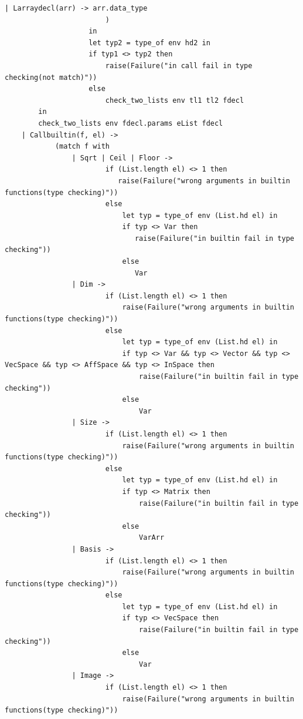 \documentclass[12pt]{article} %
\begin{document}
\begin{lstlisting}[style=appendix, caption=check.ml]
                            | Larraydecl(arr) -> arr.data_type
                        )
                    in 
                    let typ2 = type_of env hd2 in
                    if typ1 <> typ2 then
                        raise(Failure("in call fail in type checking(not match)"))
                    else
                        check_two_lists env tl1 tl2 fdecl
        in
        check_two_lists env fdecl.params eList fdecl
    | Callbuiltin(f, el) ->
            (match f with
                | Sqrt | Ceil | Floor ->
                        if (List.length el) <> 1 then
                           raise(Failure("wrong arguments in builtin functions(type checking)"))
                        else
                            let typ = type_of env (List.hd el) in
                            if typ <> Var then
                               raise(Failure("in builtin fail in type checking"))
                            else
                               Var 
                | Dim -> 
                        if (List.length el) <> 1 then
                            raise(Failure("wrong arguments in builtin functions(type checking)"))
                        else
                            let typ = type_of env (List.hd el) in
                            if typ <> Var && typ <> Vector && typ <> VecSpace && typ <> AffSpace && typ <> InSpace then
                                raise(Failure("in builtin fail in type checking"))
                            else
                                Var
                | Size ->
                        if (List.length el) <> 1 then
                            raise(Failure("wrong arguments in builtin functions(type checking)"))
                        else
                            let typ = type_of env (List.hd el) in
                            if typ <> Matrix then
                                raise(Failure("in builtin fail in type checking"))
                            else
                                VarArr
                | Basis ->
                        if (List.length el) <> 1 then
                            raise(Failure("wrong arguments in builtin functions(type checking)"))
                        else
                            let typ = type_of env (List.hd el) in
                            if typ <> VecSpace then
                                raise(Failure("in builtin fail in type checking"))
                            else
                                Var
                | Image ->
                        if (List.length el) <> 1 then
                            raise(Failure("wrong arguments in builtin functions(type checking)"))

\end{lstlisting}
\end{document}
